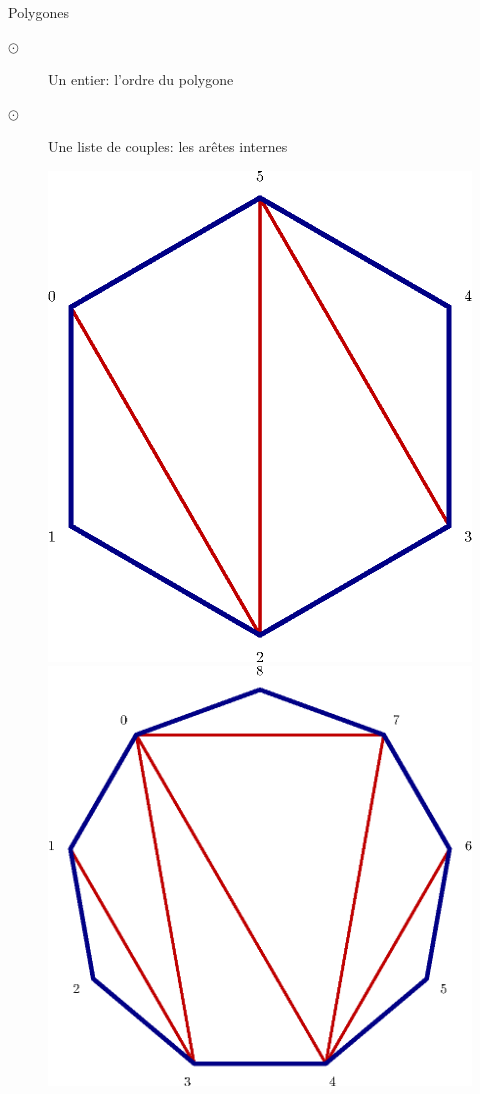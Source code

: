 \documentclass[french,xcolor=dvipsnames]{beamer}
\begin{document}
		\begin{frame}{Polygones}
			\begin{description}
			\item[$\odot$]Un entier: l'ordre du polygone
			\item[$\odot$]Une liste de couples: les arêtes internes
			\end{description}
			
			\begin{figure}
				\includegraphics[scale=0.3]{exemple_6_rot.eps}\bigskip 
				\includegraphics[scale=0.3]{exemple_triangu_9.eps}
			\end{figure}
		\end{frame}
		
\end{document}
